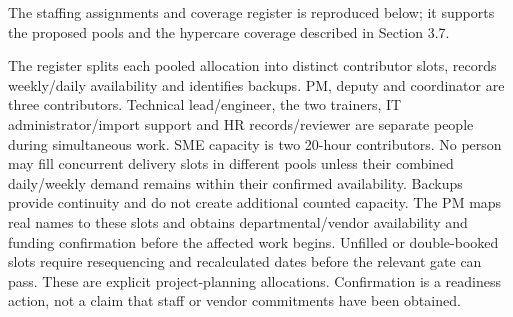 The staffing assignments and coverage register is reproduced below; it supports the proposed pools and the hypercare coverage described in Section 3.7.


The register splits each pooled allocation into distinct contributor slots, records weekly/\allowbreak{}daily availability and identifies backups. PM, deputy and coordinator are three contributors. Technical lead/\allowbreak{}engineer, the two trainers, IT administrator/\allowbreak{}import support and HR records/\allowbreak{}reviewer are separate people during simultaneous work. SME capacity is two 20-hour contributors. No person may fill concurrent delivery slots in different pools unless their combined daily/\allowbreak{}weekly demand remains within their confirmed availability. Backups provide continuity and do not create additional counted capacity. The PM maps real names to these slots and obtains departmental/\allowbreak{}vendor availability and funding confirmation before the affected work begins. Unfilled or double-booked slots require resequencing and recalculated dates before the relevant gate can pass. These are explicit project-planning allocations. Confirmation is a readiness action, not a claim that staff or vendor commitments have been obtained.

